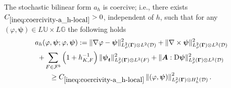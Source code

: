 \documentclass[final,onefignum,onetabnum]{mousaviart}
\begin{document}
	\vspace*{1mm}
	\begin{lemma}
		\label{lem:coersivity-a_h}
		The stochastic bilinear form $a_h$ is coercive; i.e., there exists $C_{\ref{ineq:coercivity-a_h-local}}>0$, independent of $h$, such that for 
		any $(\varphi, \boldsymbol{\psi}) \in  L \mathbb{U}  \times L \mathbb{G} $ the following holds
		\begin{multline}
			\label{ineq:coercivity-a_h-local}
			a_h (\varphi, \boldsymbol{\psi}; \varphi, \boldsymbol{\psi}) := 
			\lVert \nabla \varphi - \boldsymbol{\psi} \rVert^2_{L^2_{\rho}(\boldsymbol{\Gamma}) \otimes L^2(\mathcal{D})}
			+
			\lVert \nabla \times \boldsymbol{\psi} \rVert^2_{L^2_{\rho}(\boldsymbol{\Gamma}) \otimes L^2(\mathcal{D})}
			\\ 
			+
			\sum_{F \in \mathcal{F}^b}
			\left( 1 + h_{K,F}^{-1} \right) 
			\lVert \boldsymbol{\psi}_{\boldsymbol{t}} \rVert^2_{L^2_{\rho}(\boldsymbol{\Gamma}) \otimes L^2(F)}
			+
			\lVert \boldsymbol{A}: \mathrm{D} \boldsymbol{\psi} \rVert_{L^2_{\rho}(\boldsymbol{\Gamma}) \otimes L^2(\mathcal{D})}^2
			\\
			\geq
			C_{\ref{ineq:coercivity-a_h-local}}
			\left\| (\varphi, \boldsymbol{\psi})  \right\| ^2_{L^2_{\rho}(\boldsymbol{\Gamma}) \otimes H^1_h(\mathcal{D})}.
		\end{multline} 
	\end{lemma}
	
\end{document}
